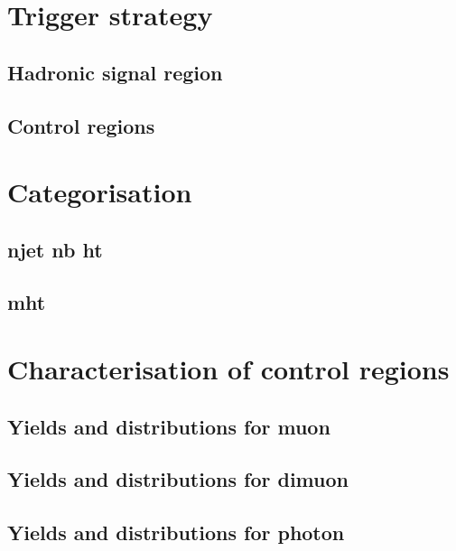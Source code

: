 \section{Trigger strategy}
\subsection{Hadronic signal region}
\subsection{Control regions}

\section{Categorisation}
\label{sec:cat}
\subsection{njet nb ht}
\subsection{mht}

\section{Characterisation of control regions}
\subsection{Yields and distributions for muon}
\subsection{Yields and distributions for dimuon}
\subsection{Yields and distributions for photon}

